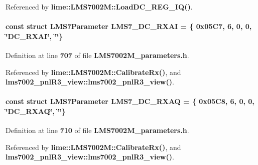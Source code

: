 Referenced by {\bf lime\+::\+L\+M\+S7002\+M\+::\+Load\+D\+C\+\_\+\+R\+E\+G\+\_\+\+I\+Q()}.

\paragraph[{L\+M\+S7\+\_\+\+D\+C\+\_\+\+R\+X\+AI}]{\setlength{\rightskip}{0pt plus 5cm}const struct {\bf L\+M\+S7\+Parameter} L\+M\+S7\+\_\+\+D\+C\+\_\+\+R\+X\+AI = \{ 0x05\+C7, 6, 0, 0, \char`\"{}\+D\+C\+\_\+\+R\+X\+A\+I\char`\"{}, \char`\"{}\char`\"{}\}\hspace{0.3cm}{\ttfamily [static]}}\label{LMS7002M__parameters_8h_a306b85a162601d20204f8e0e3a13d28b}


Definition at line {\bf 707} of file {\bf L\+M\+S7002\+M\+\_\+parameters.\+h}.



Referenced by {\bf lime\+::\+L\+M\+S7002\+M\+::\+Calibrate\+Rx()}, and {\bf lms7002\+\_\+pnl\+R3\+\_\+view\+::lms7002\+\_\+pnl\+R3\+\_\+view()}.

\paragraph[{L\+M\+S7\+\_\+\+D\+C\+\_\+\+R\+X\+AQ}]{\setlength{\rightskip}{0pt plus 5cm}const struct {\bf L\+M\+S7\+Parameter} L\+M\+S7\+\_\+\+D\+C\+\_\+\+R\+X\+AQ = \{ 0x05\+C8, 6, 0, 0, \char`\"{}\+D\+C\+\_\+\+R\+X\+A\+Q\char`\"{}, \char`\"{}\char`\"{}\}\hspace{0.3cm}{\ttfamily [static]}}\label{LMS7002M__parameters_8h_a8aa643eed02ee1a91f14f325a2e67f91}


Definition at line {\bf 710} of file {\bf L\+M\+S7002\+M\+\_\+parameters.\+h}.



Referenced by {\bf lime\+::\+L\+M\+S7002\+M\+::\+Calibrate\+Rx()}, and {\bf lms7002\+\_\+pnl\+R3\+\_\+view\+::lms7002\+\_\+pnl\+R3\+\_\+view()}.

